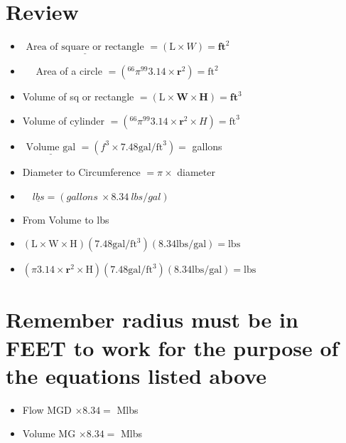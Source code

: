 \begin{enumerate}
\section{Review}
\begin{itemize}
  \item $\underline{\text { Area of square or rectangle }}=(\mathrm{L} \times W)=\mathbf{f t}^{2}$

  \item $\quad$ Area of a circle $=\left({ }^{66} \pi^{99} 3.14 \times \mathbf{r}^{2}\right)=\mathrm{ft}^{2}$

  \item Volume of sq or rectangle $=(\mathrm{L} \times \mathbf{W} \times \mathbf{H})=\mathbf{f t}^{3}$

  \item Volume of cylinder $=\left({ }^{66} \pi^{99} 3.14 \times \mathbf{r}^{2} \times H\right)=\mathrm{ft}^{3}$

  \item $\underline{\text { Volume gal }}=\left(f^{3} \times 7.48 \mathrm{gal} / \mathrm{ft}^{3}\right)=$ gallons

  \item Diameter to Circumference $=\pi \times$ diameter

  \item $\quad \underline{l b s}=(g a l l o n s ~ \times 8.34 ~ l b s / g a l)$

  \item From Volume to lbs

  \item $(\mathrm{L} \times \mathrm{W} \times \mathrm{H})\left(7.48 \mathrm{gal} / \mathrm{ft}^{3}\right)(8.34 \mathrm{lbs} / \mathrm{gal})=\mathrm{lbs}$

  \item $\left(\pi 3.14 \times \mathbf{r}^{2} \times \mathrm{H}\right)\left(7.48 \mathrm{gal} / \mathrm{ft}^{3}\right)(8.34 \mathrm{lbs} / \mathrm{gal})=\mathrm{lbs}$

\end{itemize}
\section{Remember radius must be in FEET to work for the purpose of the equations listed above}
\begin{itemize}
  \item Flow MGD $\times 8.34=$ Mlbs

  \item Volume MG $\times 8.34=$ Mlbs


\end{itemize}
\end{enumerate}
